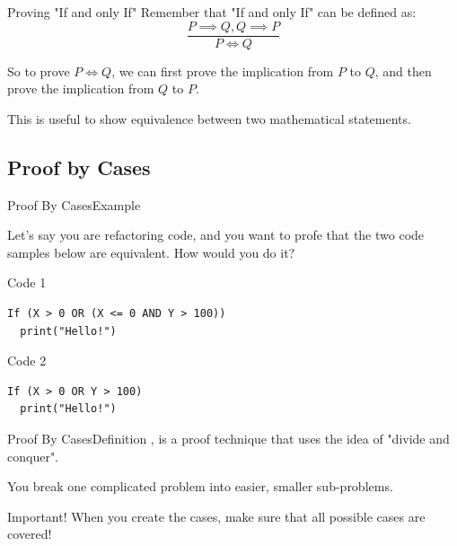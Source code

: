\begin{frame}[t]{Proving "If and only If"}
  Remember that "If and only If" can be defined as:
  \[
  \frac{P\implies Q, Q \implies P}{P\iff Q}
  \]

  So to prove $P\iff Q$, we can first prove the implication from $P$ to $Q$, and then prove the implication from $Q$ to $P$.\bigskip

  This is useful to show equivalence between two mathematical statements.
\end{frame}


\subsection{Proof by Cases}

\begin{frame}[fragile]{Proof By Cases}{Example}

  Let's say you are refactoring code, and you want to profe that the two code samples below are equivalent. How would you do it?
  \vfill

  \begin{block}{Code 1}
\begin{verbatim}
If (X > 0 OR (X <= 0 AND Y > 100))
  print("Hello!")
\end{verbatim}
  \end{block}
  \begin{block}{Code 2}
\begin{verbatim}
If (X > 0 OR Y > 100)
  print("Hello!")
\end{verbatim}
  \end{block}
\end{frame}

\begin{frame}{Proof By Cases}{Definition}
  , is a proof technique that uses the idea of "divide and conquer".\vfill

  You break one complicated problem into easier, smaller sub-problems.
  \vfill

  \alert{Important!} When you create the cases, make sure that all possible cases are covered!
\end{frame}

